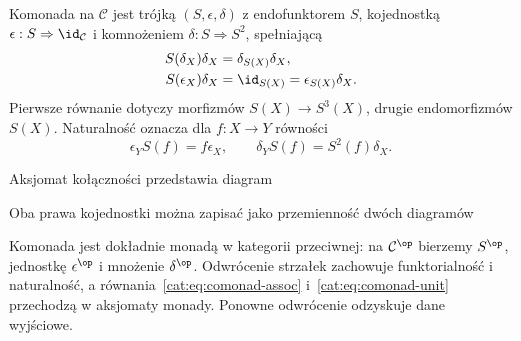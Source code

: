 \begin{definicja}[Komonada]\label{cat:def:comonad}
Komonada na $\mathcal C$ jest trójką $(S,\epsilon,\delta)$ z endofunktorem $S$, kojednostką $\epsilon:S\Rightarrow\id_{\mathcal C}$ i komnożeniem $\delta:S\Rightarrow S^2$, spełniającą
\begin{align}
 S(\delta_X)\delta_X&=\delta_{S(X)}\delta_X,\label{cat:eq:comonad-assoc}\\
 S(\epsilon_X)\delta_X&=\id_{S(X)}=\epsilon_{S(X)}\delta_X.\label{cat:eq:comonad-unit}
\end{align}
Pierwsze równanie dotyczy morfizmów $S(X)\to S^3(X)$, drugie endomorfizmów $S(X)$. Naturalność oznacza dla $f:X\to Y$ równości
\[
 \epsilon_Y S(f)=f\epsilon_X,\qquad
 \delta_Y S(f)=S^2(f)\delta_X.
\]
\end{definicja}
Aksjomat kołączności przedstawia diagram
\begin{center}
\end{center}
Oba prawa kojednostki można zapisać jako przemienność dwóch diagramów
\begin{center}
\end{center}
Komonada jest dokładnie monadą w kategorii przeciwnej: na $\mathcal C^{\op}$ bierzemy $S^{\op}$, jednostkę $\epsilon^{\op}$ i mnożenie $\delta^{\op}$. Odwrócenie strzałek zachowuje funktorialność i naturalność, a równania~\eqref{cat:eq:comonad-assoc} i~\eqref{cat:eq:comonad-unit} przechodzą w aksjomaty monady. Ponowne odwrócenie odzyskuje dane wyjściowe.


